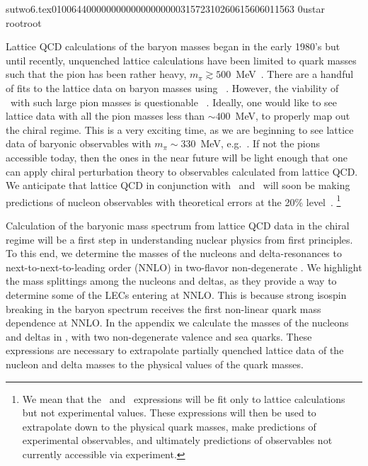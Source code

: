                                                                                                                                                                                                                                                                                       sutwo6.tex                                                                                          0100644 0000000 0000000 00000315723 10260615606 011563  0                                                                                                    ustar   root                            root                                                                                                                                                                                                                   \documentclass[prd,amssymb,amsmath,showpacs,nofootinbib,superscriptaddress]{revtex4}
\begin{document}
Lattice QCD calculations of the baryon masses began in the early
1980's but until recently, unquenched lattice calculations have been
limited to quark masses such that the pion has been rather heavy,
$m_\pi \gtrsim 500$~MeV~\cite{Bernard:2001av,AliKhan:2001tx,
  Aoki:2002uc,Zanotti:2003fx,Bernard:2003rp,Aubin:2004wf,
  Toussaint:2004cj, Renner:2004ck, Heller:2004bm}.
There are a handful of fits to the lattice data on baryon masses using
\CPT~\cite{Leinweber:2003dg,Procura:2003ig,AliKhan:2003cu,Meissner:2005mb}.
However, the viability of \CPT\ with such large pion masses is
questionable~%
\cite{Bernard:2002yk,Beane:2004ks}.  Ideally, one would like to see
lattice data with all the pion masses less than $\sim 400$~MeV, to
properly map out the chiral regime.
This is a very exciting time, as we are
beginning to see lattice data of baryonic observables with $m_\pi \sim
330$~MeV, e.g.~\cite{Renner:2004ck}.
If not the pions accessible today, then the ones in the near future
will be light enough that one can apply chiral perturbation
theory to observables calculated from lattice QCD.
We anticipate that lattice QCD in conjunction
with \CPT\ and \PQCPT\ will soon be making predictions of nucleon
observables with theoretical errors at the 20\%
level~\cite{Beane:2004ks}.%
\footnote{We mean that the \CPT\ and \PQCPT\ expressions
  will be fit only to lattice calculations but not experimental
  values.  These expressions will then be used to extrapolate down to the
  physical quark masses, make predictions of experimental
  observables, and ultimately predictions of observables not
  currently accessible via experiment.}

Calculation of the baryonic mass spectrum from
lattice QCD data in the chiral regime will be a first step in
understanding nuclear physics from first principles.  To this end, we
determine the masses of the nucleons and delta-resonances 
to next-to-next-to-leading order (NNLO) in two-flavor non-degenerate
\CPT.  We highlight the mass splittings among the nucleons and deltas,
as they provide a way to determine some of the LECs entering at
NNLO.  This is because strong isospin breaking in the baryon spectrum
receives the first non-linear quark mass dependence at NNLO.
In the appendix we calculate the masses of the nucleons and
deltas in \PQCPT, with two non-degenerate valence and sea quarks.
These expressions are necessary to extrapolate partially quenched lattice data of the
nucleon and delta masses to the physical values of the quark masses.

%
%
%
%
%
%
%
%
%
%
%
%
\end{document}
